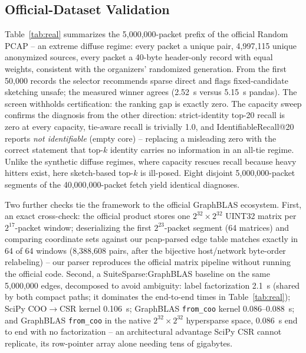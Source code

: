 \documentclass[conference]{IEEEtran}
\begin{document}
\subsection{Official-Dataset Validation}
Table~\ref{tab:real} summarizes the 5{,}000{,}000-packet prefix of the official Random PCAP -- an extreme diffuse regime: every packet a unique pair, 4{,}997{,}115 unique anonymized sources, every packet a 40-byte header-only record with equal weights, consistent with the organizers' randomized generation. From the first 50{,}000 records the selector recommends sparse direct and flags fixed-candidate sketching unsafe; the measured winner agrees (2.52~s versus 5.15~s pandas). The screen withholds certification: the ranking gap is exactly zero. The capacity sweep confirms the diagnosis from the other direction: strict-identity top-20 recall is zero at every capacity, tie-aware recall is trivially 1.0, and IdentifiableRecall@20 reports \emph{not identifiable} (empty core) -- replacing a misleading zero with the correct statement that top-$k$ identity carries no information in an all-tie regime. Unlike the synthetic diffuse regimes, where capacity rescues recall because heavy hitters exist, here sketch-based top-$k$ is ill-posed. Eight disjoint 5{,}000{,}000-packet segments of the 40{,}000{,}000-packet fetch yield identical diagnoses.

Two further checks tie the framework to the official GraphBLAS ecosystem. First, an exact cross-check: the official product stores one $2^{32}\times2^{32}$ UINT32 matrix per $2^{17}$-packet window; deserializing the first $2^{23}$-packet segment (64 matrices) and comparing coordinate sets against our pcap-parsed edge table matches exactly in 64 of 64 windows (8{,}388{,}608 pairs, after the bijective host/network byte-order relabeling) -- our parser reproduces the official matrix pipeline without running the official code. Second, a SuiteSparse:GraphBLAS baseline on the same 5{,}000{,}000 edges, decomposed to avoid ambiguity: label factorization 2.1~s (shared by both compact paths; it dominates the end-to-end times in Table~\ref{tab:real}); SciPy COO$\to$CSR kernel 0.106~s; GraphBLAS \texttt{from\_coo} kernel 0.086--0.088~s; and GraphBLAS \texttt{from\_coo} in the native $2^{32}\times2^{32}$ hypersparse space, 0.086~s end to end with no factorization -- an architectural advantage SciPy CSR cannot replicate, its row-pointer array alone needing tens of gigabytes.
\end{document}
